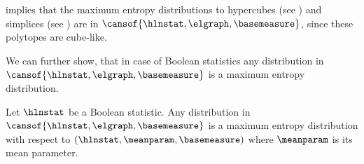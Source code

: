  implies that the maximum entropy distributions to hypercubes (see ) and simplices (see ) are in $\cansof{\hlnstat,\elgraph,\basemeasure}$, since these polytopes are cube-like.

We can further show, that in case of Boolean statistics any distribution in $\cansof{\hlnstat,\elgraph,\basemeasure}$ is a maximum entropy distribution.


\begin{theorem}
    Let $\hlnstat$ be a Boolean statistic.
    Any distribution in $\cansof{\hlnstat,\elgraph,\basemeasure}$ is a maximum entropy distribution with respect to $(\hlnstat,\meanparam,\basemeasure)$ where $\meanparam$ is its mean parameter.
\end{theorem}
